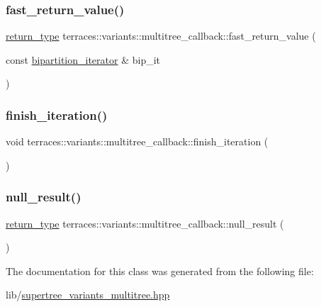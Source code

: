 \subsubsection{\texorpdfstring{fast\+\_\+return\+\_\+value()}{fast\_return\_value()}}
{\footnotesize\ttfamily \hyperlink{classterraces_1_1variants_1_1multitree__callback_a31341dbe798daa06859cd3e0ab354bf1}{return\+\_\+type} terraces\+::variants\+::multitree\+\_\+callback\+::fast\+\_\+return\+\_\+value (\begin{DoxyParamCaption}\item[{const \hyperlink{classterraces_1_1bipartition__iterator}{bipartition\+\_\+iterator} \&}]{bip\+\_\+it }\end{DoxyParamCaption})\hspace{0.3cm}{\ttfamily [inline]}}

\mbox{\label{classterraces_1_1variants_1_1multitree__callback_ab9765a7cf217bcffe4c81648e829ef92}} 
\subsubsection{\texorpdfstring{finish\+\_\+iteration()}{finish\_iteration()}}
{\footnotesize\ttfamily void terraces\+::variants\+::multitree\+\_\+callback\+::finish\+\_\+iteration (\begin{DoxyParamCaption}{ }\end{DoxyParamCaption})\hspace{0.3cm}{\ttfamily [inline]}}

\mbox{\label{classterraces_1_1variants_1_1multitree__callback_a504be6c2590bdcc5b40a12e00a4889c3}} 
\subsubsection{\texorpdfstring{null\+\_\+result()}{null\_result()}}
{\footnotesize\ttfamily \hyperlink{classterraces_1_1variants_1_1multitree__callback_a31341dbe798daa06859cd3e0ab354bf1}{return\+\_\+type} terraces\+::variants\+::multitree\+\_\+callback\+::null\+\_\+result (\begin{DoxyParamCaption}{ }\end{DoxyParamCaption})\hspace{0.3cm}{\ttfamily [inline]}}



The documentation for this class was generated from the following file\+:\begin{DoxyCompactItemize}
\item 
lib/\hyperlink{supertree__variants__multitree_8hpp}{supertree\+\_\+variants\+\_\+multitree.\+hpp}\end{DoxyCompactItemize}
